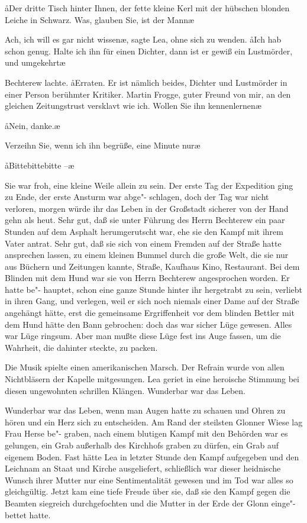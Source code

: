 \aa{}Der dritte Tisch hinter Ihnen, der fette kleine Kerl mit der
hübschen blonden Leiche in Schwarz. Was, glauben Sie, ist
der Mann\frag{}\ae{}

\aanah{}Ach, ich will es gar nicht wissen\ae{}, sagte Lea, ohne sich zu
wenden. \aa{}Ich hab schon genug. Halte ich ihn für einen Dichter,
dann ist er gewiß ein Lustmörder, und umgekehrt\ausr{}\ae{}

Bechterew lachte. \aa{}Erraten. Er ist nämlich beides, Dichter
und Lustmörder in einer Person\dopp{} berühmter Kritiker. Martin
Frogge, guter Freund von mir, an den gleichen Zeitungstrust
versklavt wie ich. Wollen Sie ihn kennenlernen\frag{}\ae{}

\aa{}Nein, danke.\ae{}

\aanah{}Verzeihn Sie, wenn ich ihn begrüße, eine Minute nur\frag{}\ae{}

\aa{}Bittebittebitte --\ae{}

Sie war froh, eine kleine Weile allein zu sein. Der erste Tag
der Expedition ging zu Ende, der erste Ansturm war abge"-%
schlagen, doch der Tag war nicht verloren, morgen würde ihr
das Leben in der Großstadt sicherer von der Hand gehn als
heut. Sehr gut, daß sie unter Führung des Herrn Bechterew
ein paar Stunden auf dem Asphalt herumgerutscht war, ehe
sie den Kampf mit ihrem Vater antrat. Sehr gut, daß sie sich
von einem Fremden auf der Straße hatte ansprechen lassen,
zu einem kleinen Bummel durch die große Welt, die sie nur
aus Büchern und Zeitungen kannte, Straße, Kaufhaus
Kino, Restaurant. Bei dem Blinden mit dem Hund war sie
von Herrn Bechterew angesprochen worden. Er hatte be"-%
hauptet, schon eine ganze Stunde hinter ihr hergetrabt zu
sein, verliebt in ihren Gang, und verlegen, weil er sich noch
niemals einer Dame auf der Straße angehängt hätte, erst die
gemeinsame Ergriffenheit vor dem blinden Bettler mit dem
Hund hätte den Bann gebrochen: doch das war sicher Lüge
gewesen. Alles war Lüge ringsum. Aber man mußte diese
Lüge fest ins Auge fassen, um die Wahrheit, die dahinter steckte,
zu packen.

Die Musik spielte einen amerikanischen Marsch. Der Refrain
wurde von allen Nichtbläsern der Kapelle mitgesungen. Lea
geriet in eine heroische Stimmung bei diesen ungewohnten
schrillen Klängen. Wunderbar war das Leben.

Wunderbar war das Leben, wenn man Augen hatte zu
schauen und Ohren zu hören und ein Herz sich zu entscheiden.
Am Rand der steilsten Glonner Wiese lag Frau Herse be"-%
graben, nach einem blutigen Kampf mit den Behörden war
es gelungen, ein Grab außerhalb des Kirchhofs graben zu
dürfen, ein Grab auf eigenem Boden. Fast hätte Lea in letzter
Stunde den Kampf aufgegeben und den Leichnam an Staat
und Kirche ausgeliefert, schließlich war dieser heidnische
Wunsch ihrer Mutter nur eine Sentimentalität gewesen und
im Tod war alles so gleichgültig. Jetzt kam eine tiefe Freude
über sie, daß sie den Kampf gegen die Beamten siegreich
durchgefochten und die Mutter in der Erde der Glonn einge"-%
bettet hatte.

